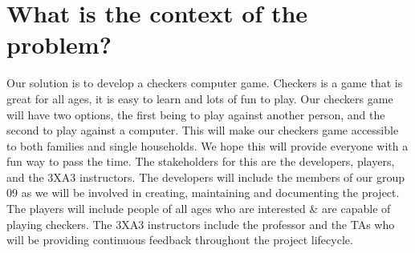 \documentclass{article}
\begin{document}
\section{What is the context of the problem?}
Our solution is to develop a checkers computer game. Checkers is a game that is great for all ages, it is easy to learn and lots of fun to play. Our checkers game will have two options, the first being to play against another person, and the second to play against a computer. This will make our checkers game accessible to both families and single households. We hope this will provide everyone with a fun way to pass the time. The stakeholders for this are the developers, players, and the 3XA3 instructors. The developers will include the members of our group 09 as we will be involved in creating, maintaining and documenting the project. The players will include people of all ages who are interested \& are capable of playing checkers. The 3XA3 instructors include the professor and the TAs who will be providing continuous feedback throughout the project lifecycle.
\end{document}
